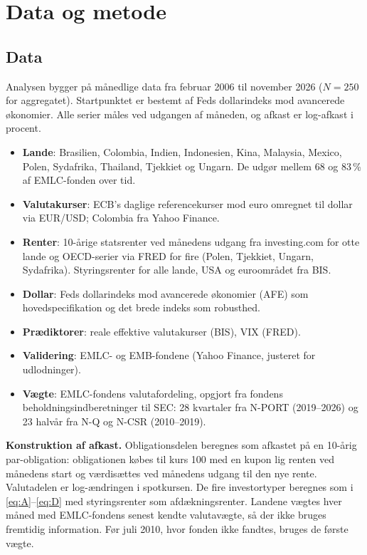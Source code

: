 \documentclass[11pt,a4paper]{article}
\begin{document}
\section{Data og metode}

\subsection{Data}
Analysen bygger på månedlige data fra februar 2006 til november 2026 ($N=250$ for aggregatet). Startpunktet er bestemt af Feds dollarindeks mod avancerede økonomier. Alle serier måles ved udgangen af måneden, og afkast er log-afkast i procent.

\begin{itemize}[leftmargin=1.2em,itemsep=0.15em]
\item \textbf{Lande}: Brasilien, Colombia, Indien, Indonesien, Kina, Malaysia, Mexico, Polen, Sydafrika, Thailand, Tjekkiet og Ungarn. De udgør mellem 68 og 83\,\% af EMLC-fonden over tid.
\item \textbf{Valutakurser}: ECB's daglige referencekurser mod euro omregnet til dollar via EUR/USD; Colombia fra Yahoo Finance.
\item \textbf{Renter}: 10-årige statsrenter ved månedens udgang fra investing.com for otte lande og OECD-serier via FRED for fire (Polen, Tjekkiet, Ungarn, Sydafrika). Styringsrenter for alle lande, USA og euroområdet fra BIS.
\item \textbf{Dollar}: Feds dollarindeks mod avancerede økonomier (AFE) som hovedspecifikation og det brede indeks som robusthed.
\item \textbf{Prædiktorer}: reale effektive valutakurser (BIS), VIX (FRED).
\item \textbf{Validering}: EMLC- og EMB-fondene (Yahoo Finance, justeret for udlodninger).
\item \textbf{Vægte}: EMLC-fondens valutafordeling, opgjort fra fondens beholdningsindberetninger til SEC: 28 kvartaler fra N-PORT (2019--2026) og 23 halvår fra N-Q og N-CSR (2010--2019).
\end{itemize}

\textbf{Konstruktion af afkast.} Obligationsdelen beregnes som afkastet på en 10-årig par-obligation: obligationen købes til kurs 100 med en kupon lig renten ved månedens start og værdisættes ved månedens udgang til den nye rente. Valutadelen er log-ændringen i spotkursen. De fire investortyper beregnes som i \eqref{eq:A}--\eqref{eq:D} med styringsrenter som afdækningsrenter. Landene vægtes hver måned med EMLC-fondens senest kendte valutavægte, så der ikke bruges fremtidig information. Før juli 2010, hvor fonden ikke fandtes, bruges de første vægte.
\end{document}

